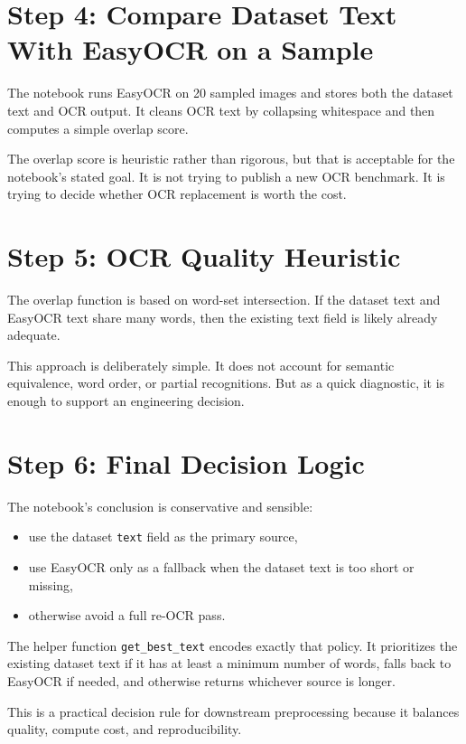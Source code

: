 \documentclass[11pt,a4paper]{report}
\begin{document}
\section{Step 4: Compare Dataset Text With EasyOCR on a Sample}

The notebook runs EasyOCR on 20 sampled images and stores both the dataset text and OCR output. It cleans OCR text by collapsing whitespace and then computes a simple overlap score.

The overlap score is heuristic rather than rigorous, but that is acceptable for the notebook's stated goal. It is not trying to publish a new OCR benchmark. It is trying to decide whether OCR replacement is worth the cost.

\section{Step 5: OCR Quality Heuristic}

The overlap function is based on word-set intersection. If the dataset text and EasyOCR text share many words, then the existing text field is likely already adequate.

This approach is deliberately simple. It does not account for semantic equivalence, word order, or partial recognitions. But as a quick diagnostic, it is enough to support an engineering decision.

\section{Step 6: Final Decision Logic}

The notebook's conclusion is conservative and sensible:

\begin{itemize}
\item use the dataset \texttt{text} field as the primary source,
\item use EasyOCR only as a fallback when the dataset text is too short or missing,
\item otherwise avoid a full re-OCR pass.
\end{itemize}

The helper function \texttt{get\_best\_text} encodes exactly that policy. It prioritizes the existing dataset text if it has at least a minimum number of words, falls back to EasyOCR if needed, and otherwise returns whichever source is longer.

This is a practical decision rule for downstream preprocessing because it balances quality, compute cost, and reproducibility.
\end{document}
